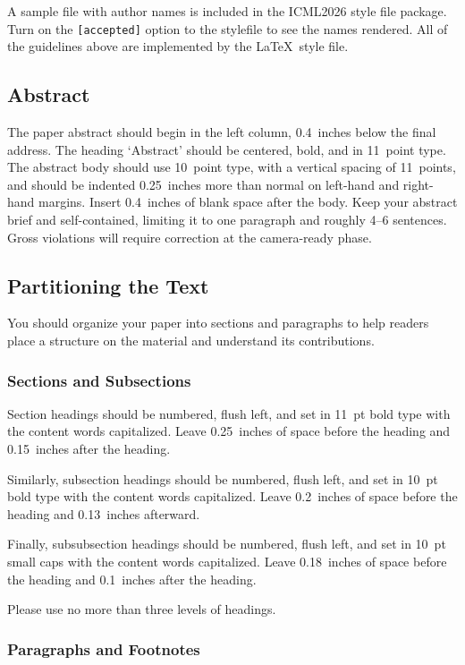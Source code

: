 \documentclass{article}
\theoremstyle{plain}
\theoremstyle{definition}
\theoremstyle{remark}
\begin{document}
A sample file with author names is included in the ICML2026 style file
package. Turn on the \texttt{[accepted]} option to the stylefile to
see the names rendered. All of the guidelines above are implemented
by the \LaTeX\ style file.

\subsection{Abstract}

The paper abstract should begin in the left column, 0.4~inches below the final
address. The heading `Abstract' should be centered, bold, and in 11~point type.
The abstract body should use 10~point type, with a vertical spacing of
11~points, and should be indented 0.25~inches more than normal on left-hand and
right-hand margins. Insert 0.4~inches of blank space after the body. Keep your
abstract brief and self-contained, limiting it to one paragraph and roughly 4--6
sentences. Gross violations will require correction at the camera-ready phase.

\subsection{Partitioning the Text}

You should organize your paper into sections and paragraphs to help readers
place a structure on the material and understand its contributions.

\subsubsection{Sections and Subsections}

Section headings should be numbered, flush left, and set in 11~pt bold type
with the content words capitalized. Leave 0.25~inches of space before the
heading and 0.15~inches after the heading.

Similarly, subsection headings should be numbered, flush left, and set in 10~pt
bold type with the content words capitalized. Leave
0.2~inches of space before the heading and 0.13~inches afterward.

Finally, subsubsection headings should be numbered, flush left, and set in
10~pt small caps with the content words capitalized. Leave
0.18~inches of space before the heading and 0.1~inches after the heading.

Please use no more than three levels of headings.

\subsubsection{Paragraphs and Footnotes}
\end{document}
